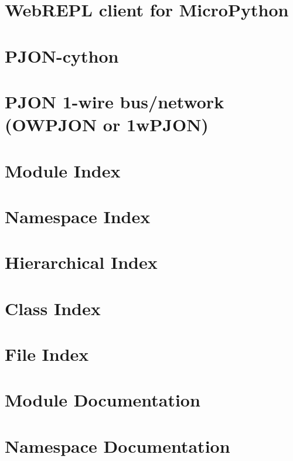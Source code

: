 \documentclass[twoside]{book}
\begin{document}
\chapter{Web\-R\-E\-P\-L client for Micro\-Python}
\label{md_micpy_webrepl-master_README}
\hypertarget{md_micpy_webrepl-master_README}{}

\chapter{P\-J\-O\-N-\/cython}
\label{md_OWPJON_PJON-cython_README}
\hypertarget{md_OWPJON_PJON-cython_README}{}

\chapter{P\-J\-O\-N 1-\/wire bus/network (O\-W\-P\-J\-O\-N or 1w\-P\-J\-O\-N)}
\label{md_OWPJON_README}
\hypertarget{md_OWPJON_README}{}

\chapter{Module Index}

\chapter{Namespace Index}

\chapter{Hierarchical Index}

\chapter{Class Index}

\chapter{File Index}

\chapter{Module Documentation}

\chapter{Namespace Documentation}






























\end{document}
